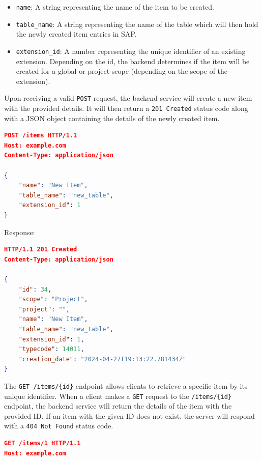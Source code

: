 \begin{itemize}
    \item \texttt{name}: A string representing the name of the item to be created.
    \item \texttt{table\_name}: A string representing the name of the table which will then hold the newly created item entries in SAP.
    \item \texttt{extension\_id}: A number representing the unique identifier of an existing extension.
    Depending on the id, the backend determines if the item will be created for a global or project scope (depending on the scope of the extension).
\end{itemize}

Upon receiving a valid \texttt{POST} request, the backend service will create a new item with the provided details.
It will then return a \texttt{201 Created} status code along with a JSON object containing the details of the newly created item.

\begin{lstlisting}[language=json,label={lst:lstlisting7}]
POST /items HTTP/1.1
Host: example.com
Content-Type: application/json

{
    "name": "New Item",
    "table_name": "new_table",
    "extension_id": 1
}
\end{lstlisting}

Response:

\begin{lstlisting}[language=json,label={lst:lstlisting8}]
HTTP/1.1 201 Created
Content-Type: application/json

{
    "id": 34,
    "scope": "Project",
    "project": "",
    "name": "New Item",
    "table_name": "new_table",
    "extension_id": 1,
    "typecode": 14011,
    "creation_date": "2024-04-27T19:13:22.781434Z"
}
\end{lstlisting}


The \texttt{GET /items/\{id\}} endpoint allows clients to retrieve a specific item by its unique identifier.
When a client makes a \texttt{GET} request to the \texttt{/items/\{id\}} endpoint, the backend service will return the details of the item with the provided ID. If an item with the given ID does not exist, the server will respond with a \texttt{404 Not Found} status code.

\begin{lstlisting}[language=json,label={lst:lstlisting9}]
GET /items/1 HTTP/1.1
Host: example.com
\end{lstlisting}

